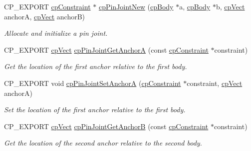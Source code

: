 \begin{DoxyCompactItemize}
C\+P\+\_\+\+E\+X\+P\+O\+RT \hyperlink{structcpConstraint}{cp\+Constraint} $\ast$ \hyperlink{group__cpPinJoint_gae5aae573d6abec53660c4dfdb8e181c5}{cp\+Pin\+Joint\+New} (\hyperlink{structcpBody}{cp\+Body} $\ast$a, \hyperlink{structcpBody}{cp\+Body} $\ast$b, \hyperlink{structcpVect}{cp\+Vect} anchorA, \hyperlink{structcpVect}{cp\+Vect} anchorB)
\begin{DoxyCompactList}\small\item\em Allocate and initialize a pin joint. \end{DoxyCompactList}\item 
\mbox{\label{group__cpPinJoint_gac7244e7bc4ad95d7ebecb692dc909e04}} 
C\+P\+\_\+\+E\+X\+P\+O\+RT \hyperlink{structcpVect}{cp\+Vect} \hyperlink{group__cpPinJoint_gac7244e7bc4ad95d7ebecb692dc909e04}{cp\+Pin\+Joint\+Get\+AnchorA} (const \hyperlink{structcpConstraint}{cp\+Constraint} $\ast$constraint)
\begin{DoxyCompactList}\small\item\em Get the location of the first anchor relative to the first body. \end{DoxyCompactList}\item 
\mbox{\label{group__cpPinJoint_gace722d745a34b9cf1145bca66e075961}} 
C\+P\+\_\+\+E\+X\+P\+O\+RT void \hyperlink{group__cpPinJoint_gace722d745a34b9cf1145bca66e075961}{cp\+Pin\+Joint\+Set\+AnchorA} (\hyperlink{structcpConstraint}{cp\+Constraint} $\ast$constraint, \hyperlink{structcpVect}{cp\+Vect} anchorA)
\begin{DoxyCompactList}\small\item\em Set the location of the first anchor relative to the first body. \end{DoxyCompactList}\item 
\mbox{\label{group__cpPinJoint_ga21a091a978025cf154fcea2ef19c39dc}} 
C\+P\+\_\+\+E\+X\+P\+O\+RT \hyperlink{structcpVect}{cp\+Vect} \hyperlink{group__cpPinJoint_ga21a091a978025cf154fcea2ef19c39dc}{cp\+Pin\+Joint\+Get\+AnchorB} (const \hyperlink{structcpConstraint}{cp\+Constraint} $\ast$constraint)
\begin{DoxyCompactList}\small\item\em Get the location of the second anchor relative to the second body. \end{DoxyCompactList}\item 
\mbox{\label{group__cpPinJoint_ga70254f1f1e082f55544ae29593a37b6b}} 

\end{DoxyCompactItemize}

